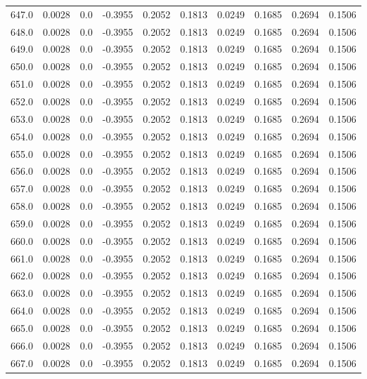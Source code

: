 \begin{longtable}{lrrrrrrrrr}
647.0 & 0.0028 & 0.0 & -0.3955 & 0.2052 & 0.1813 & 0.0249 & 0.1685 & 0.2694 & 0.1506 \\
648.0 & 0.0028 & 0.0 & -0.3955 & 0.2052 & 0.1813 & 0.0249 & 0.1685 & 0.2694 & 0.1506 \\
649.0 & 0.0028 & 0.0 & -0.3955 & 0.2052 & 0.1813 & 0.0249 & 0.1685 & 0.2694 & 0.1506 \\
650.0 & 0.0028 & 0.0 & -0.3955 & 0.2052 & 0.1813 & 0.0249 & 0.1685 & 0.2694 & 0.1506 \\
651.0 & 0.0028 & 0.0 & -0.3955 & 0.2052 & 0.1813 & 0.0249 & 0.1685 & 0.2694 & 0.1506 \\
652.0 & 0.0028 & 0.0 & -0.3955 & 0.2052 & 0.1813 & 0.0249 & 0.1685 & 0.2694 & 0.1506 \\
653.0 & 0.0028 & 0.0 & -0.3955 & 0.2052 & 0.1813 & 0.0249 & 0.1685 & 0.2694 & 0.1506 \\
654.0 & 0.0028 & 0.0 & -0.3955 & 0.2052 & 0.1813 & 0.0249 & 0.1685 & 0.2694 & 0.1506 \\
655.0 & 0.0028 & 0.0 & -0.3955 & 0.2052 & 0.1813 & 0.0249 & 0.1685 & 0.2694 & 0.1506 \\
656.0 & 0.0028 & 0.0 & -0.3955 & 0.2052 & 0.1813 & 0.0249 & 0.1685 & 0.2694 & 0.1506 \\
657.0 & 0.0028 & 0.0 & -0.3955 & 0.2052 & 0.1813 & 0.0249 & 0.1685 & 0.2694 & 0.1506 \\
658.0 & 0.0028 & 0.0 & -0.3955 & 0.2052 & 0.1813 & 0.0249 & 0.1685 & 0.2694 & 0.1506 \\
659.0 & 0.0028 & 0.0 & -0.3955 & 0.2052 & 0.1813 & 0.0249 & 0.1685 & 0.2694 & 0.1506 \\
660.0 & 0.0028 & 0.0 & -0.3955 & 0.2052 & 0.1813 & 0.0249 & 0.1685 & 0.2694 & 0.1506 \\
661.0 & 0.0028 & 0.0 & -0.3955 & 0.2052 & 0.1813 & 0.0249 & 0.1685 & 0.2694 & 0.1506 \\
662.0 & 0.0028 & 0.0 & -0.3955 & 0.2052 & 0.1813 & 0.0249 & 0.1685 & 0.2694 & 0.1506 \\
663.0 & 0.0028 & 0.0 & -0.3955 & 0.2052 & 0.1813 & 0.0249 & 0.1685 & 0.2694 & 0.1506 \\
664.0 & 0.0028 & 0.0 & -0.3955 & 0.2052 & 0.1813 & 0.0249 & 0.1685 & 0.2694 & 0.1506 \\
665.0 & 0.0028 & 0.0 & -0.3955 & 0.2052 & 0.1813 & 0.0249 & 0.1685 & 0.2694 & 0.1506 \\
666.0 & 0.0028 & 0.0 & -0.3955 & 0.2052 & 0.1813 & 0.0249 & 0.1685 & 0.2694 & 0.1506 \\
667.0 & 0.0028 & 0.0 & -0.3955 & 0.2052 & 0.1813 & 0.0249 & 0.1685 & 0.2694 & 0.1506 \\

\end{longtable}
